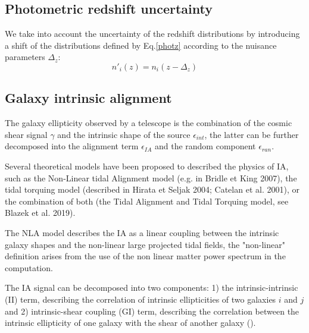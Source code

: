 \documentclass[twocolumn,twocolappendix]{aastex63}
\begin{document}
\subsection{Photometric redshift uncertainty}

 We take into account the uncertainty of the redshift distributions by introducing  a shift of the distributions defined by Eq.\ref{photz} according to the nuisance parameters $\Delta_z$:
 \begin{equation}
     n'_i(z)= n_i(z-\Delta_z)
 \end{equation}

\subsection{Galaxy intrinsic alignment}

The galaxy ellipticity observed by a telescope is the combination of the cosmic shear signal $\gamma$ and the intrinsic shape of the source $\epsilon_{int}$, the latter can be further decomposed into the alignment term $\epsilon_{IA}$ and the random component $\epsilon_{ran}$. 

Several theoretical models have been proposed to described the physics of IA, such as the Non-Linear tidal Alignment model (e.g. in Bridle et King 2007), the tidal torquing model (described in Hirata et Seljak 2004; Catelan et al. 2001), or the combination of both (the Tidal Alignment and Tidal Torquing model, see Blazek et al. 2019).

The NLA model describes the IA as a linear coupling between the intrinsic galaxy shapes and the non-linear large projected tidal fields, the "non-linear" definition arises from the use of the non linear matter power spectrum in the computation. 

The IA signal can be decomposed into two components: 1) the intrinsic-intrinsic (II) term, describing the correlation of intrinsic ellipticities of two galaxies $i$ and $j$ and 2) intrinsic-shear coupling (GI) term, describing the correlation between the intrinsic ellipticity of one galaxy with the shear of another galaxy (\cite{kilbinger2015cosmology}).
\end{document}
